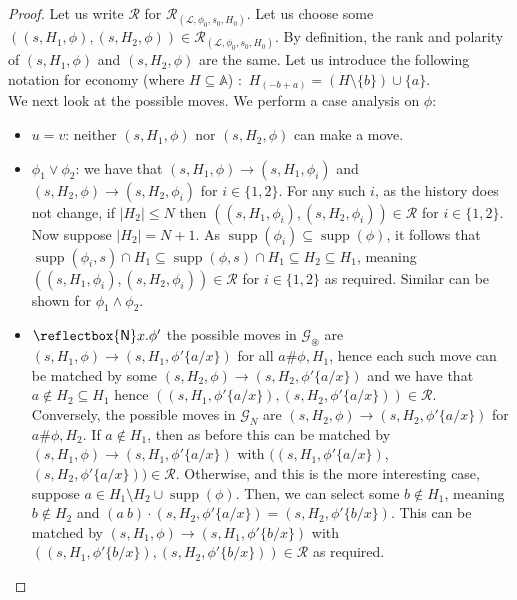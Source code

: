 \documentclass[10pt,a4paper]{article}
\theoremstyle{definition}
\theoremstyle{remark}
\newcommand\new[0]{\reflectbox{\ensuremath{\mathsf{N}}}}
\newcommand\fresh[1]{\new #1.}
\DeclareMathOperator{\supp}{supp}
\newcommand\Gcal{\mathcal{G}}
\newcommand\Lcal{\mathcal{L}}
\newcommand\Rcal{\mathcal{R}}
\newcommand\Atoms{\mathbb{A}}
\renewcommand\S{N}
\newcommand\fgame[0]{\Gcal_\circledast}
\begin{document}
\boundingisnombisim*
\begin{proof}
  Let us write $\Rcal$ for $\Rcal_{(\Lcal, \phi_0, s_0, H_0)}$.
Let us choose some $((s, H_1, \phi),(s, H_2, \phi)) \in \Rcal_{(\Lcal, \phi_0, s_0, H_0)}$. By definition, the rank and polarity of $(s, H_1, \phi)$ and $(s, H_2, \phi)$ are the same.
        Let us introduce the following notation for economy (where $ H \subseteq \Atoms$) :\
        $ H_{(-b+a)} = ( H \setminus \{b\}) \cup \{a\}$.\\
        We next look at the possible moves.
We perform a case analysis on $\phi$:
    \begin{itemize}
        \item $u = v$: neither $(s, H_1, \phi)$ nor $(s, H_2, \phi)$ can make a move.
                        \item $\phi_1 \lor \phi_2$: we have that $(s, H_1, \phi) \rightarrow (s, H_1, \phi_i)$ and $(s, H_2, \phi) \rightarrow (s, H_2, \phi_i)$ for $i \in \{1, 2\}$. 
        For any such $i$, as the history does not change, if $|H_2| \le \S $ then $((s, H_1, \phi_i), (s, H_2, \phi_i)) \in \Rcal$ for $i \in \{1,2\}$. 
        Now suppose $|H_2| = \S + 1$. 
        As $\supp(\phi_i) \subseteq \supp(\phi)$, it follows that $\supp(\phi_i, s) \cap H_1 \subseteq \supp(\phi, s) \cap H_1 \subseteq H_2 \subseteq H_1$, meaning $((s, H_1, \phi_i),(s, H_2, \phi_i)) \in \Rcal$ for $i \in \{1,2\}$ as required.
        Similar can be shown for $\phi_1 \land \phi_2$.
                \item $\fresh{x} \phi'$ the possible moves in $\fgame$ are $(s, H_1, \phi)\rightarrow (s, H_1, \phi'\{a/x\})$ for all $a \# \phi,H_1$, hence each such move can be matched by some $(s, H_2, \phi) \rightarrow (s, H_2, \phi'\{a/x\})$ and we have that $a \notin H_2 \subseteq H_1$ hence $((s, H_1, \phi'\{a/x\}),(s, H_2, \phi'\{a/x\})) \in \Rcal$. 
        \\
        Conversely, the possible moves in $\Gcal_\S$ are $(s, H_2, \phi) \rightarrow (s, H_2, \phi'\{a/x\})$ for $a \# \phi,H_2$. 
        If $a \notin H_1$, then as before this can be matched by $(s, H_1, \phi)\rightarrow (s, H_1, \phi'\{a/x\})$ with $((s, H_1, \phi'\{a/x\})$, $(s, H_2, \phi'\{a/x\})) \in \Rcal$.
        Otherwise, {and this is the more interesting case}, suppose $a \in H_1 \setminus H_2\cup\supp(\phi)$.
Then, we can select some $b \notin H_1$, meaning $b \notin H_2$ and $(a\ b)\cdot (s, H_2, \phi'\{a/x\}) = (s, H_2, \phi'\{b/x\})$. This can be matched by $(s, H_1, \phi) \rightarrow (s, H_1, \phi'\{b/x\})$ with $((s, H_1, \phi'\{b/x\}), (s, H_2, \phi'\{b/x\})) \in \Rcal$ as required. 

\end{itemize}
\end{proof}
\end{document}
